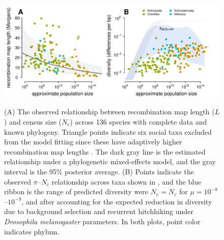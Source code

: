 \documentclass[9pt,lineno]{elife}
\begin{document}
\begin{figure}[t!]
  \begin{fullwidth}
  \includegraphics[width=\linewidth]{figure_3.pdf}

  \caption{(A) The observed relationship between recombination map length ($L$)
    and census size ($N_c$) across 136 species with complete data and known
    phylogeny. Triangle points indicate six social taxa excluded from the model
    fitting since these have adaptively higher recombination map lengths
    \citep{Wilfert2007-dx}. The dark gray line is the estimated
    relationship under a phylogenetic mixed-effects model, and the gray
    interval is the 95\% posterior average. (B) Points indicate the observed
    $\pi$--$N_c$ relationship across taxa shown in ,
    and the blue ribbon is the range of predicted diversity were $N_e = N_c$
    for $\mu = 10^{-8}$--$10^{-9}$,  and after accounting for the expected
  reduction in diversity due to background selection and recurrent hitchhiking
under \emph{Drosophila melanogaster} parameters. In both plots, point color
indicates phylum.}\label{fig:linksel}

  \label{figsupp:genome-size-Nc}


\end{fullwidth}
\end{figure}
\end{document}
